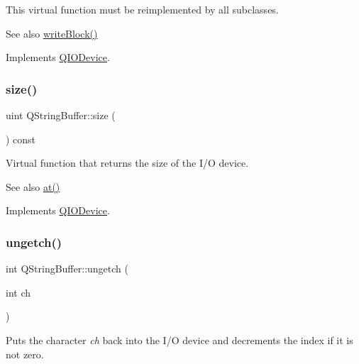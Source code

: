 This virtual function must be reimplemented by all subclasses.

\begin{DoxySeeAlso}{See also}
\mbox{\hyperlink{class_q_string_buffer_a4c17bf2b2702b837ba614bd92ad0d7a2}{write\+Block()}} 
\end{DoxySeeAlso}


Implements \mbox{\hyperlink{class_q_i_o_device_a71f10647e4bd98141f45362b9a06983a}{Q\+I\+O\+Device}}.

\mbox{\label{class_q_string_buffer_a914433284831ecca2b30f80a642d175e}} 
\subsubsection{\texorpdfstring{size()}{size()}}
{\footnotesize\ttfamily uint Q\+String\+Buffer\+::size (\begin{DoxyParamCaption}{ }\end{DoxyParamCaption}) const\hspace{0.3cm}{\ttfamily [virtual]}}

Virtual function that returns the size of the I/O device. \begin{DoxySeeAlso}{See also}
\mbox{\hyperlink{class_q_string_buffer_ad5305aacadba80e595b741142f67538e}{at()}} 
\end{DoxySeeAlso}


Implements \mbox{\hyperlink{class_q_i_o_device_a60c4146763625213ac7aa29f1f071592}{Q\+I\+O\+Device}}.

\mbox{\label{class_q_string_buffer_ad6e53fb9f2f2969b9f9a7a1daa2d7af2}} 
\subsubsection{\texorpdfstring{ungetch()}{ungetch()}}
{\footnotesize\ttfamily int Q\+String\+Buffer\+::ungetch (\begin{DoxyParamCaption}\item[{int}]{ch }\end{DoxyParamCaption})\hspace{0.3cm}{\ttfamily [virtual]}}

Puts the character {\itshape ch} back into the I/O device and decrements the index if it is not zero.

